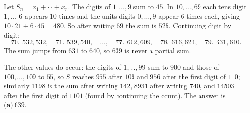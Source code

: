 Let $S_n=x_1+\cdots+x_n$. The digits of $1,\dots,9$ sum to $45$. In $10,\dots,69$ each tens digit $1,\dots,6$ appears $10$ times and the units digits $0,\dots,9$ appear $6$ times each, giving $10\cdot21+6\cdot45=480$. So after writing $69$ the sum is $525$. Continuing digit by digit:
\[
70:\ 532,532;\quad 71:\ 539,540;\quad\ldots;\quad 77:\ 602,609;\quad 78:\ 616,624;\quad 79:\ 631,640 .
\]
The sum jumps from $631$ to $640$, so $639$ is never a partial sum.

The other values do occur: the digits of $1,\dots,99$ sum to $900$ and those of $100,\dots,109$ to $55$, so $S$ reaches $955$ after $109$ and $956$ after the first digit of $110$; similarly $1198$ is the sum after writing $142$, $8931$ after writing $740$, and $14503$ after the first digit of $1101$ (found by continuing the count). The answer is $\boxed{\textbf{(a)}\ 639}$.
